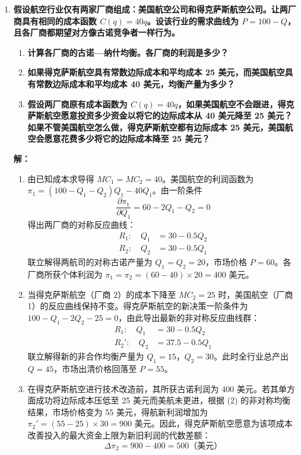 \begin{enumerate}[label=\textbf{\arabic*.}, leftmargin=*]
		\newpage
		\item \textbf{假设航空行业仅有两家厂商组成：美国航空公司和得克萨斯航空公司。让两厂商具有相同的成本函数 $C(q) = 40q$。设该行业的需求曲线为 $P = 100 - Q$，且各厂商都期望对方像古诺竞争者一样行为。}
		
		\begin{enumerate}
			\item \textbf{计算各厂商的古诺—纳什均衡。各厂商的利润是多少？}
			\item \textbf{如果得克萨斯航空具有常数边际成本和平均成本 25 美元，而美国航空具有常数边际成本和平均成本 40 美元，均衡产量为多少？}
			\item \textbf{假设两厂商原有成本函数为 $C(q) = 40q$，如果美国航空不会跟进，得克萨斯航空愿意投资多少资金以将它的边际成本从 40 美元降至 25 美元？如果不管美国航空怎么做，得克萨斯航空都有边际成本 25 美元，美国航空会愿意花费多少将它的边际成本降至 25 美元？}
		\end{enumerate}
		
		\textbf{解：}
		\begin{enumerate}
			\item[(1)] 由已知成本求导得 $MC_1 = MC_2 = 40$。美国航空的利润函数为 $\pi_1 = (100 - Q_1 - Q_2)Q_1 - 40Q_1$。由一阶条件 $$\frac{\partial\pi_1}{\partial Q_1} = 60 - 2Q_1 - Q_2 = 0$$
			得出两厂商的对称反应曲线：
			\[
			\begin{aligned}
				R_1: \quad Q_1 &= 30 - 0.5Q_2 \\
				R_2: \quad Q_2 &= 30 - 0.5Q_1
			\end{aligned}
			\]
			联立解得两航司的对称古诺产量为 $Q_1 = Q_2 = 20$，市场价格 $P = 60$。各厂商所获个体利润为 $\pi_1 = \pi_2 = (60 - 40) \times 20 = 400$ 美元。
			
			\item[(2)] 当得克萨斯航空（厂商 2）的成本下降至 $MC_2 = 25$ 时，美国航空（厂商 1）的反应曲线保持不变。得克萨斯航空的新决策一阶条件为 $100 - Q_1 - 2Q_2 - 25 = 0$，由此导出最新的非对称反应曲线群：
			\[
			\begin{aligned}
				R_1: \quad Q_1 &= 30 - 0.5Q_2 \\
				R_2': \quad Q_2 &= 37.5 - 0.5Q_1
			\end{aligned}
			\]
			联立解得新的非合作均衡产量为 $Q_1 = 15$，$Q_2 = 30$。此时全行业总产出 $Q = 45$，市场出清价格回落至 $P = 55$。
			
			\item[(3)] 在得克萨斯航空进行技术改造前，其所获古诺利润为 400 美元。若其单方面成功将边际成本压低至 25 美元而美航未更进，根据 (2) 的非对称均衡结果，市场价格变为 55 美元，得航新利润增加为 $\pi_2' = (55 - 25) \times 30 = 900$ 美元。因此，得克萨斯航空愿意为该项成本改善投入的最大资金上限为新旧利润的代数差额：
			\[ \Delta\pi_2 = 900 - 400 = 500 \text{（美元）} \]
			

\end{enumerate}
\end{enumerate}
